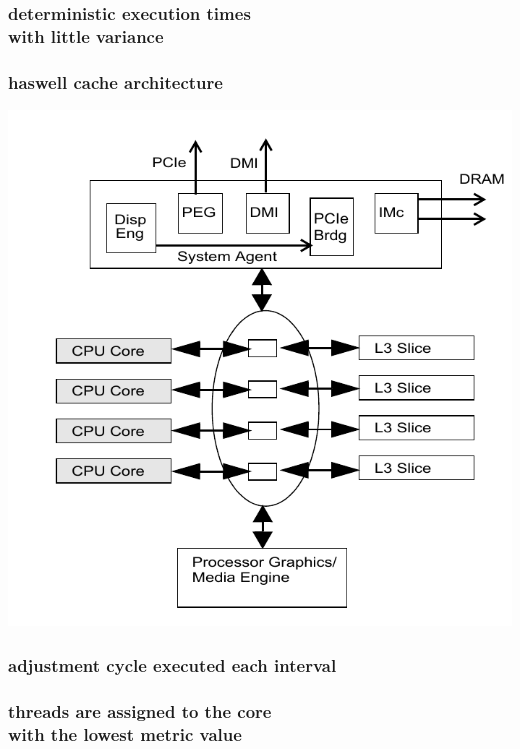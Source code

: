 \documentclass[utf8,10pt]{beamer}
\begin{document}
\begin{frame}
  \frametitle{deterministic execution times \\ with little variance}

\end{frame}


\begin{frame}
  \frametitle{haswell cache architecture}
  \centering
  \begin{minipage}[l]{.49\columnwidth}
    
  \end{minipage}
  \begin{minipage}[r]{.49\columnwidth}
    \includegraphics[scale=.27]{../haswell_architecture_by_intel_large_cropped}
  \end{minipage}
\end{frame}

\begin{frame}
  \frametitle{adjustment cycle executed each interval}
  \centering
  
\end{frame}


\begin{frame}
  \frametitle{threads are assigned to the core \\ with the lowest metric value}
  \centering
  
\end{frame}
\end{document}
